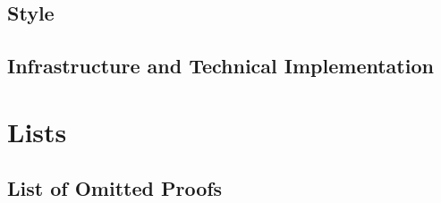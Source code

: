 \subsection{Style}\label{subsection-style}
\subsection{Infrastructure and Technical Implementation}\label{subsection-infrastructure-and-technical-implementation}
\section{Lists}\label{section-lists}
\subsection{List of Omitted Proofs}\label{subsection-list-of-omitted-proofs}

